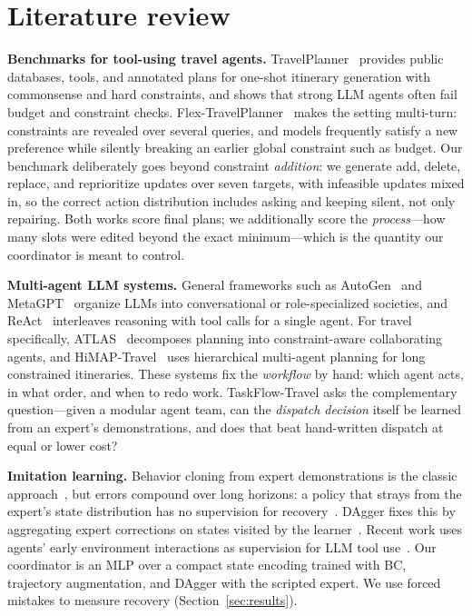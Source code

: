 \documentclass{article}
\begin{document}
\section{Literature review}
\label{sec:litreview}

\textbf{Benchmarks for tool-using travel agents.}
TravelPlanner~\citep{xie2024travelplanner} provides public databases, tools,
and annotated plans for one-shot itinerary generation with commonsense and
hard constraints, and shows that strong LLM agents often fail budget and
constraint checks. Flex-TravelPlanner~\citep{oh2025flextravelplanner} makes
the setting multi-turn: constraints are revealed over several queries, and
models frequently satisfy a new preference while silently breaking an
earlier global constraint such as budget. Our benchmark deliberately goes
beyond constraint \emph{addition}: we generate add, delete, replace, and
reprioritize updates over seven targets, with infeasible updates mixed in,
so the correct action distribution includes asking and keeping silent, not
only repairing. Both works score final plans; we additionally score the
\emph{process}---how many slots were edited beyond the exact minimum---which
is the quantity our coordinator is meant to control.

\textbf{Multi-agent LLM systems.} General frameworks such as
AutoGen~\citep{wu2023autogen} and MetaGPT~\citep{hong2024metagpt} organize
LLMs into conversational or role-specialized societies, and
ReAct~\citep{yao2023react} interleaves reasoning with tool calls for a
single agent. For travel specifically, ATLAS~\citep{choi2025atlas}
decomposes planning into constraint-aware collaborating agents, and
HiMAP-Travel~\citep{bui2026himaptravel} uses hierarchical multi-agent
planning for long constrained itineraries. These systems fix the
\emph{workflow} by hand: which agent acts, in what order, and when to redo
work. TaskFlow-Travel asks the complementary question---given a modular
agent team, can the \emph{dispatch decision} itself be learned from an
expert's demonstrations, and does that beat hand-written dispatch at equal
or lower cost?

\textbf{Imitation learning.} Behavior cloning from expert demonstrations is
the classic approach~\citep{pomerleau1991alvinn}, but errors compound over
long horizons: a policy that strays from the expert's state distribution has
no supervision for recovery~\citep{ross2010efficient}. DAgger fixes this by
aggregating expert corrections on states visited by the
learner~\citep{ross2011dagger}. Recent work uses agents' early environment
interactions as supervision for LLM tool use~\citep{zhang2026earlyexperience}.
Our coordinator is an MLP over a compact state encoding trained with BC,
trajectory augmentation, and DAgger with the scripted expert. We use
forced mistakes to measure recovery (Section~\ref{sec:results}).
\end{document}
